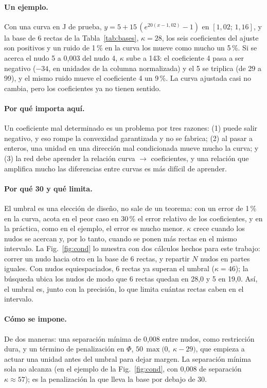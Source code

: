 \paragraph{Un ejemplo.} Con una curva en J de prueba, $y=5+15\,(e^{20(x-1{,}02)}-1)$ en $[1{,}02;\,1{,}16]$, y la base de 6 rectas de la Tabla~\ref{tab:bases}, $\kappa=28$, los seis coeficientes del ajuste son positivos y un ruido de 1\,\% en la curva los mueve como mucho un 5\,\%. Si se acerca el nudo 5 a 0,003 del nudo 4, $\kappa$ sube a 143: el coeficiente 4 pasa a ser negativo ($-34$, en unidades de la columna normalizada) y el 5 se triplica (de 29 a 99), y el mismo ruido mueve el coeficiente 4 un 9\,\%. La curva ajustada casi no cambia, pero los coeficientes ya no tienen sentido.

\paragraph{Por qué importa aquí.} Un coeficiente mal determinado es un problema por tres razones: (1) puede salir negativo, y eso rompe la convexidad garantizada y no se fabrica; (2) al pasar a enteros, una unidad en una dirección mal condicionada mueve mucho la curva; y (3) la red debe aprender la relación curva $\to$ coeficientes, y una relación que amplifica mucho las diferencias entre curvas es más difícil de aprender.

\paragraph{Por qué 30 y qué limita.} El umbral es una elección de diseño, no sale de un teorema: con un error de 1\,\% en la curva, acota en el peor caso en 30\,\% el error relativo de los coeficientes, y en la práctica, como en el ejemplo, el error es mucho menor. $\kappa$ crece cuando los nudos se acercan y, por lo tanto, cuando se ponen más rectas en el mismo intervalo. La Fig.~\ref{fig:cond} lo muestra con dos cálculos hechos para este trabajo: correr un nudo hacia otro en la base de 6 rectas, y repartir $N$ nudos en partes iguales. Con nudos equiespaciados, 6 rectas ya superan el umbral ($\kappa=46$); la búsqueda ubica los nudos de modo que 6 rectas quedan en 28,0 y 5 en 19,0. Así, el umbral es, junto con la precisión, lo que limita cuántas rectas caben en el intervalo.

\paragraph{Cómo se impone.} De dos maneras: una separación mínima de 0,008 entre nudos, como restricción dura, y un término de penalización en $\Phi$, $50\,\max\bigl(0,\ \kappa-29\bigr)$, que empieza a actuar una unidad antes del umbral para dejar margen. La separación mínima sola no alcanza (en el ejemplo de la Fig.~\ref{fig:cond}, con 0,008 de separación $\kappa\approx57$); es la penalización la que lleva la base por debajo de 30.

